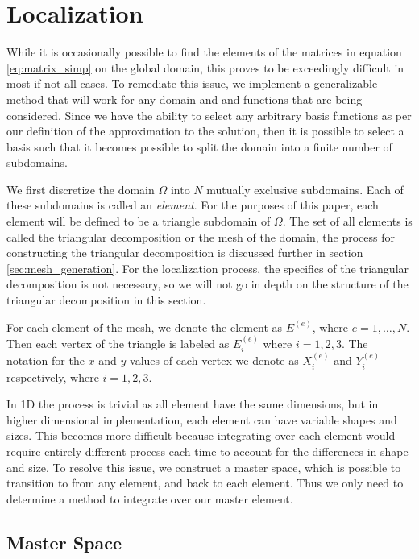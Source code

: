 \documentclass[../fem.tex]{subfile}
\begin{document}
\section{Localization}%
\label{sec:localization}

While it is occasionally possible to find the elements of the matrices in
equation \ref{eq:matrix_simp} on the global domain, this proves to be
exceedingly difficult in most if not all cases. To remediate this issue, we
implement a generalizable method that will work for any domain and and
functions that are being considered. Since we have the ability to select any
arbitrary basis functions as per our definition of the approximation to the
solution, then it is possible to select a basis such that it becomes
possible to split the domain into a finite number of subdomains.

We first discretize the domain $\Omega$ into $N$ mutually exclusive subdomains.
Each of these subdomains is called an \textit{element}. For the purposes of
this paper, each element will be defined to be a triangle subdomain of
$\Omega$. The set of all elements is called the triangular decomposition or the
mesh of the domain, the process for constructing the triangular decomposition
is discussed further in section \ref{sec:mesh_generation}. For the localization
process, the specifics of the triangular decomposition is not necessary, so we
will not go in depth on the structure of the triangular decomposition in this
section.

For each element of the mesh, we denote the element as $E^{(e)}$, where
$e=1,\ldots,N$. Then each vertex of the triangle is labeled as $E^{(e)}_i$
where $i=1,2,3$. The notation for the $x$ and $y$ values of each vertex we
denote as $X^{(e)}_i$ and $Y^{(e)}_i$ respectively, where $i=1,2,3$.

In 1D the process is trivial as all element have the same dimensions, but in
higher dimensional implementation, each element can have variable shapes and
sizes. This becomes more difficult because integrating over each element would
require entirely different process each time to account for the differences in
shape and size. To resolve this issue, we construct a master space, which is
possible to transition to from any element, and back to each element. Thus we
only need to determine a method to integrate over our master element.

\subsection{Master Space}%
\label{sub:master_space}
\end{document}
